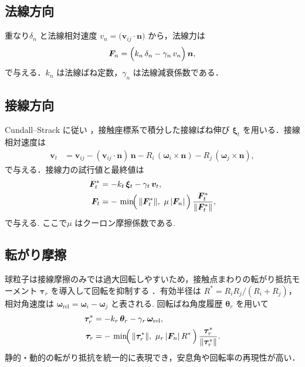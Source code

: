 \documentclass[a4paper,10pt,twocolumn]{ltjsarticle}
\begin{document}
\subsection{法線方向}
重なり$\delta_n$ と法線相対速度 $v_n=\bigl(\bm v_{ij}\cdot\bm n\bigr)$ から，法線力は
\begin{align}
  \bm F_n
  = \Bigl(k_n\,\delta_n - \gamma_n\, v_n \Bigr)\,\bm n ,
  \label{eq:Fn}
\end{align}
で与える．$k_n$ は法線ばね定数，$\gamma_n$ は法線減衰係数である．

\subsection{接線方向}
Cundall--Strack に従い \cite{Cundall1979}，接触座標系で積分した接線ばね伸び $\bm\xi_t$ を用いる．接線相対速度は
\begin{align}
  \bm v_t & = \bm v_{ij} - (\bm v_{ij}\!\cdot\!\bm n)\,\bm n
  - R_i\,(\bm\omega_i\!\times\!\bm n)
  - R_j\,(\bm\omega_j\!\times\!\bm n),
\end{align}
で与える．接線力の試行値と最終値は
\begin{align}
  \bm F_t^\ast & = -k_t\,\bm\xi_t - \gamma_t\,\bm v_t,                          \\
  \bm F_t      & = -\,\min\!\Bigl(\,\|\bm F_t^\ast\|,\ \mu\,|\bm F_n|\,\Bigr)\,
  \frac{\bm F_t^\ast}{\|\bm F_t^\ast\|},
  \label{eq:Ft_min}
\end{align}
で与える. ここで$\mu$ はクーロン摩擦係数である.

\subsection{転がり摩擦}
球粒子は接線摩擦のみでは過大回転しやすいため，接触点まわりの転がり抵抗モーメント $\bm\tau_r$ を導入して回転を抑制する \cite{Iwashita1998}．有効半径は $R^\ast=R_iR_j/(R_i+R_j)$，相対角速度は $\bm\omega_\mathrm{rel}=\bm\omega_i-\bm\omega_j$ と表される.
回転ばね角度履歴 $\bm\theta_r$ を用いて
\begin{align}
  \bm\tau_r^\ast & = -k_r\,\bm\theta_r - \gamma_r\,\bm\omega_\mathrm{rel},                    \\
  \bm\tau_r      & = -\,\min\!\Bigl(\,\|\bm\tau_r^\ast\|,\ \mu_r\,|\bm F_n|\,R^\ast\,\Bigr)\,
  \frac{\bm\tau_r^\ast}{\|\bm\tau_r^\ast\|}.
  \label{eq:rr_min}
\end{align}
静的・動的の転がり抵抗を統一的に表現でき，安息角や回転率の再現性が高い．
\end{document}
